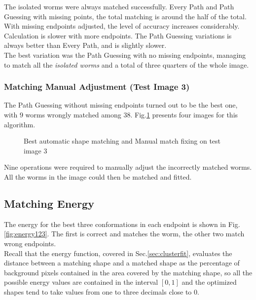 The isolated worms were always matched successfully.
Every Path and Path Guessing with missing points, 
the total matching is around the half of the total. 
With missing endpoints adjusted, the level of accuracy increases considerably.
Calculation is slower with more endpoints.
The Path Guessing variations is always better than Every Path, and is slightly slower.\\
The best variation was the Path Guessing with no missing endpoints, managing
to match all the \emph{isolated worms} and a total of three quarters of the 
whole image.

\subsubsection*{Matching Manual Adjustment (Test Image 3)}

The Path Guessing without missing endpoints turned out to be the best one, with $9$ worms wrongly matched among $38$.
Fig.\ref{fig:best3} presents four images for this algorithm.

\begin{figure}[h!]
  \centering
\qquad
\qquad
\qquad
  \caption{Best automatic shape matching and Manual match fixing on test image 3}
  \label{fig:best3}
\end{figure}


Nine operations were required to manually adjust the incorrectly matched worms.
All the worms in the image could then be matched and fitted.

\subsection{Matching Energy}

The energy for the best three conformations in each endpoint is shown in Fig.\ref{fig:energy123}.
The first is correct and matches the worm, the other two match wrong endpoints.\\
Recall that the energy function, covered
in Sec.\ref{sec:clusterfit}, evaluates the distance between a matching shape
and a matched shape as the percentage of background pixels contained in the 
area covered by the matching shape, so all the possible energy values are
contained in the interval $[0,1]$ and the optimized shapes tend to take values
from one to three decimals close to $0$.

